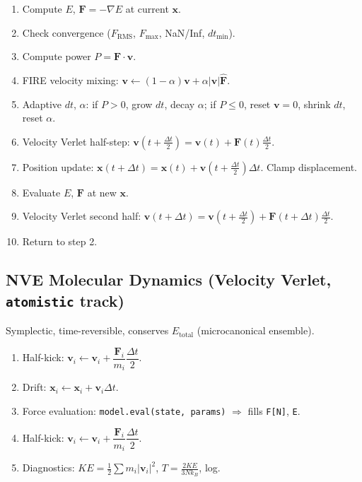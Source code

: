 \documentclass[11pt,a4paper]{article}
\begin{document}
\begin{enumerate}[label=\arabic*.]
  \item Compute $E$, $\mathbf{F} = -\nabla E$ at current $\mathbf{x}$.
  \item Check convergence ($F_{\mathrm{RMS}}$, $F_{\mathrm{max}}$, NaN/Inf, $dt_{\min}$).
  \item Compute power $P = \mathbf{F} \cdot \mathbf{v}$.
  \item FIRE velocity mixing: $\mathbf{v} \leftarrow (1-\alpha)\mathbf{v} + \alpha|\mathbf{v}|\hat{\mathbf{F}}$.
  \item Adaptive $dt$, $\alpha$: if $P > 0$, grow $dt$, decay $\alpha$; if $P \leq 0$, reset $\mathbf{v} = 0$, shrink $dt$, reset $\alpha$.
  \item Velocity Verlet half-step: $\mathbf{v}(t + \tfrac{\Delta t}{2}) = \mathbf{v}(t) + \mathbf{F}(t)\tfrac{\Delta t}{2}$.
  \item Position update: $\mathbf{x}(t+\Delta t) = \mathbf{x}(t) + \mathbf{v}(t+\tfrac{\Delta t}{2})\Delta t$. Clamp displacement.
  \item Evaluate $E$, $\mathbf{F}$ at new $\mathbf{x}$.
  \item Velocity Verlet second half: $\mathbf{v}(t+\Delta t) = \mathbf{v}(t+\tfrac{\Delta t}{2}) + \mathbf{F}(t+\Delta t)\tfrac{\Delta t}{2}$.
  \item Return to step 2.
\end{enumerate}

\subsection{NVE Molecular Dynamics (Velocity Verlet, \texttt{atomistic} track)}

Symplectic, time-reversible, conserves $E_{\mathrm{total}}$ (microcanonical ensemble).

\begin{enumerate}[label=\arabic*.]
  \item Half-kick: $\mathbf{v}_i \leftarrow \mathbf{v}_i + \dfrac{\mathbf{F}_i}{m_i}\dfrac{\Delta t}{2}$.
  \item Drift: $\mathbf{x}_i \leftarrow \mathbf{x}_i + \mathbf{v}_i \Delta t$.
  \item Force evaluation: \texttt{model.eval(state, params)} $\Rightarrow$ fills \texttt{F[N]}, \texttt{E}.
  \item Half-kick: $\mathbf{v}_i \leftarrow \mathbf{v}_i + \dfrac{\mathbf{F}_i}{m_i}\dfrac{\Delta t}{2}$.
  \item Diagnostics: $KE = \tfrac{1}{2}\sum m_i |\mathbf{v}_i|^2$, $T = \tfrac{2KE}{3Nk_B}$, log.
\end{enumerate}
\end{document}
